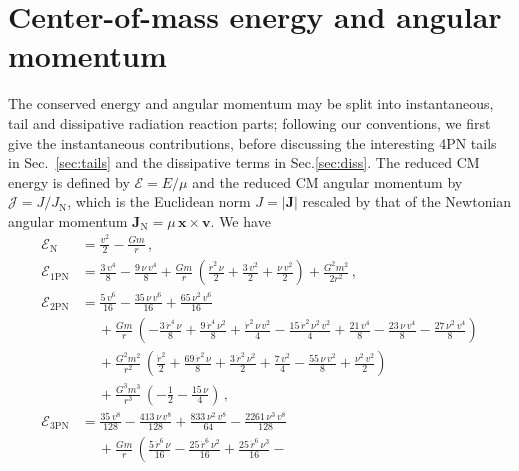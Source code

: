 \documentclass[prd,preprint,superscriptaddress,tightenlines,nofootinbib,
  eqsecnum,showpacs]{revtex4}
\begin{document}
\section{Center-of-mass energy and angular momentum} 
\label{sec:cons} 

The conserved energy and angular momentum may be split into instantaneous,
tail and dissipative radiation reaction parts; following our conventions, we
first give the instantaneous contributions, before discussing the interesting 4PN
tails in Sec.~\ref{sec:tails} and the dissipative terms in Sec.\ref{sec:diss}.
The reduced CM energy is defined by $\mathcal{E}=E/\mu$ and the reduced CM angular
momentum by $\mathcal{J}=J/J_\text{N}$, which is the Euclidean norm
$J=\vert\bm{J}\vert$ rescaled by that of the Newtonian angular momentum
$\bm{J}_\text{N}=\mu\,\bm{x}\times\bm{v}$. We have
%
\begin{subequations}\label{E}\begin{align}
\mathcal{E}_\text{N} &= \frac{v^2}{2}-\frac{G m}{r}\,,\\ 
\mathcal{E}_\text{1PN} &= \frac{3\,v^4}{8} - \frac{9\,\nu\,v^4}{8} +
\frac{G m}{r}\,\left( \frac{\dot{r}^2\,\nu}{2} + \frac{3\,v^2}{2} +
\frac{\nu\,v^2}{2} \right)+\frac{G^2m^2}{2r^2}\,,\\ 
\mathcal{E}_\text{2PN} &= \frac{5\,v^6}{16} - \frac{35\,\nu\,v^6}{16} +
\frac{65\,\nu^2\,v^6}{16} \nonumber\\ &\quad~ + \frac{G m}{r}\,\left(
-\frac{3\,\dot{r}^4\,\nu}{8} + \frac{9\,\dot{r}^4\,\nu^2}{8} +
\frac{\dot{r}^2\,\nu\,v^2}{4} - \frac{15\,\dot{r}^2\,\nu^2\,v^2}{4} +
\frac{21\,v^4}{8} - \frac{23\,\nu\,v^4}{8} - \frac{27\,\nu^2\,v^4}{8}
\right)\nonumber\\ &\quad~ +\frac{G^2m^2}{r^2}\,\left(
\frac{\dot{r}^2}{2} + \frac{69\,\dot{r}^2\,\nu}{8} +
\frac{3\,\dot{r}^2\,\nu^2}{2} + \frac{7\,v^2}{4} -
\frac{55\,\nu\,v^2}{8} + \frac{\nu^2\,v^2}{2} \right) \nonumber\\
&\quad~+\frac{G^3m^3}{r^3}\,\left( -\frac{1}{2}- \frac{15\,\nu}{4}
\right)\,,\\ 
\mathcal{E}_\text{3PN} &= \frac{35\,v^8}{128} -
\frac{413\,\nu\,v^8}{128} + \frac{833\,\nu^2\,v^8}{64} -
\frac{2261\,\nu^3\,v^8}{128} \nonumber\\ &\quad~ + \frac{G
  m}{r}\,\left( \frac{5\,\dot{r}^6\,\nu}{16} -
\frac{25\,\dot{r}^6\,\nu^2}{16} + \frac{25\,\dot{r}^6\,\nu^3}{16} -

\end{align}
\end{subequations}
\end{document}
